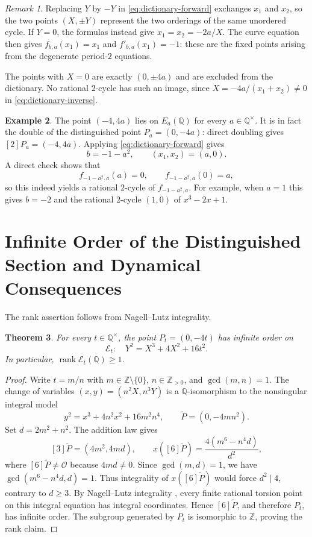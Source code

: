\documentclass[11pt,a4paper]{amsart}
\newtheorem{theorem}{Theorem}[section]
\theoremstyle{definition}
\newtheorem{example}[theorem]{Example}
\theoremstyle{remark}
\newtheorem{remark}[theorem]{Remark}
\numberwithin{equation}{section}
\newcommand{\Q}{\mathbb{Q}}
\newcommand{\Z}{\mathbb{Z}}
\newcommand{\mathcalE}{\mathcal{E}}
\newcommand{\rank}{\operatorname{rank}}
\begin{document}
\begin{remark}\label{rem:dictionary-degeneracies}
Replacing $Y$ by $-Y$ in \eqref{eq:dictionary-forward} exchanges $x_1$
and $x_2$, so the two points $(X,\pm Y)$ represent the two orderings of
the same unordered cycle. If $Y=0$, the formulas instead give
$x_1=x_2=-2a/X$. The curve equation then gives
$f_{b,a}(x_1)=x_1$ and $f'_{b,a}(x_1)=-1$: these are the fixed points
arising from the degenerate period-$2$ equations.

The points with $X=0$ are exactly $(0,\pm4a)$ and are excluded from the
dictionary. No rational $2$-cycle has such an image, since
$X=-4a/(x_1+x_2)\neq0$ in \eqref{eq:dictionary-inverse}.
\end{remark}

\begin{example}\label{ex:dictionary-first-example}
The point $(-4,4a)$ lies on $E_a(\Q)$ for every $a\in\Q^\times$. It is in fact the double of the distinguished point \(P_a=(0,-4a)\): direct doubling gives \([2]P_a=(-4,4a)\). Applying \eqref{eq:dictionary-forward} gives
\[
b=-1-a^2,\qquad (x_1,x_2)=(a,0).
\]
A direct check shows that
\[
f_{-1-a^2,a}(a)=0,\qquad f_{-1-a^2,a}(0)=a,
\]
so this indeed yields a rational $2$-cycle of $f_{-1-a^2,a}$.
For example, when \(a=1\) this gives \(b=-2\) and the rational
\(2\)-cycle \((1,0)\) of \(x^3-2x+1\).
\end{example}

\section{Infinite Order of the Distinguished Section and Dynamical Consequences}\label{sec:rank}

The rank assertion follows from Nagell--Lutz integrality.

\begin{theorem}\label{thm:Pt-infinite}
For every $t\in\Q^\times$, the point $P_t=(0,-4t)$ has infinite order on
\begin{equation}\label{eq:Et-family}
\mathcalE_t:\quad Y^2=X^3+4X^2+16t^2.
\end{equation}
In particular, $\rank\mathcalE_t(\Q)\ge1$.
\end{theorem}

\begin{proof}
Write $t=m/n$ with $m\in\Z\setminus\{0\}$, $n\in\Z_{>0}$,
and $\gcd(m,n)=1$. The change of variables $(x,y)=(n^2X,n^3Y)$
is a $\Q$-isomorphism to the nonsingular integral model
\[
 y^2=x^3+4n^2x^2+16m^2n^4,
 \qquad \widetilde P=(0,-4mn^2).
\]
Set $d=2m^2+n^2$. The addition law gives
\[
 [3]\widetilde P=(4m^2,4md),\qquad
 x([6]\widetilde P)=\frac{4(m^6-n^4d)}{d^2},
\]
where $[6]\widetilde P\ne\mathcal O$ because $4md\ne0$.
Since $\gcd(m,d)=1$, we have $\gcd(m^6-n^4d,d)=1$.
Thus integrality of $x([6]\widetilde P)$ would force $d^2\mid4$,
contrary to $d\ge3$. By Nagell--Lutz integrality
\cite[Theorem~2.5, p.~56]{silvermantate2015rational}, every finite rational
torsion point on this integral equation has integral coordinates.
Hence $[6]\widetilde P$, and therefore $P_t$, has infinite order.
The subgroup generated by $P_t$ is isomorphic to $\Z$, proving the rank claim.
\end{proof}
\end{document}
